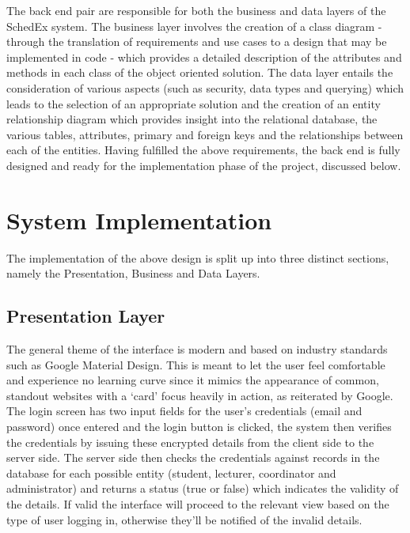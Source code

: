 \documentclass{article}
\begin{document}
The back end pair are responsible for both the business and data layers of the SchedEx system. The business layer involves the creation of a class diagram - through the translation of requirements and use cases to a design that may be implemented in code - which provides a detailed description of the attributes and methods in each class of the object oriented solution. The data layer entails the consideration of various aspects (such as security, data types and querying) which leads to the selection of an appropriate solution and the creation of an entity relationship diagram which provides insight into the relational database, the various tables, attributes, primary and foreign keys and the relationships between each of the entities. Having fulfilled the above requirements, the back end is fully designed and ready for the implementation phase of the project, discussed below.

\section{System Implementation}

The implementation of the above design is split up into three distinct sections, namely the Presentation, Business and Data Layers.

\subsection{Presentation Layer}

The general theme of the interface is modern and based on industry standards such as Google Material Design. This is meant to let the user feel comfortable and experience no learning curve since it mimics the appearance of common, standout websites with a ‘card’ focus heavily in action, as reiterated by Google.
The login screen has two input fields for the user’s credentials (email and password) once entered and the login button is clicked, the system then verifies the credentials by issuing these encrypted details from the client side to the server side. The server side then checks the credentials against records in the database for each possible entity (student, lecturer, coordinator and administrator) and returns a status (true or false) which indicates the validity of the details. If valid the interface will proceed to the relevant view based on the type of user logging in, otherwise they’ll be notified of the invalid details.
\end{document}

